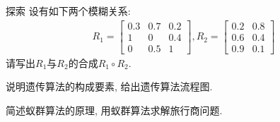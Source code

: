 \begin{custom}[explorecolor]{探索}
设有如下两个模糊关系:
\begin{align*}
R_{1}=\left[
\begin{array}{ccc}{0.3} & {0.7} & {0.2} \\ {1} & {0} & {0.4} \\ {0} & {0.5} & {1}\end{array}\right],
R_{2}=\left[\begin{array}{cc}{0.2} & {0.8} \\ {0.6} & {0.4} \\ {0.9} & {0.1}\end{array}\right]
\end{align*}请写出$R_1$与$R_2$的合成$R_1\circ R_2$.
\end{custom}
\begin{think}
    说明遗传算法的构成要素, 给出遗传算法流程图.
\end{think}

\begin{think}
    简述蚁群算法的原理, 用蚁群算法求解旅行商问题.
\end{think}

